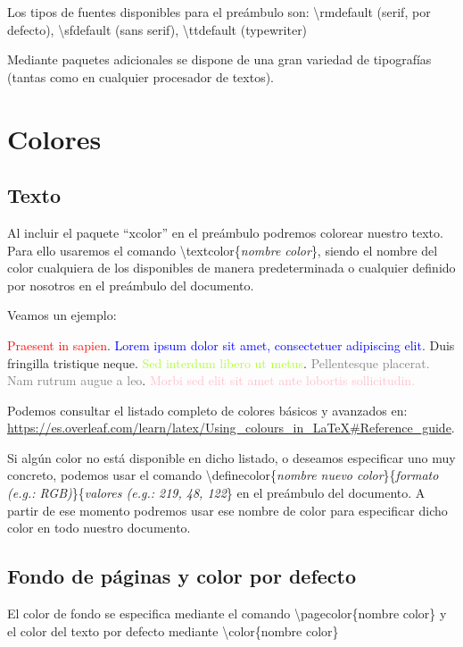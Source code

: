 \documentclass[12pt]{book} %
\begin{document}
Los tipos de fuentes disponibles para el preámbulo son: \textbackslash rmdefault (serif, por defecto), \textbackslash sfdefault (sans serif), \textbackslash ttdefault (typewriter)

Mediante paquetes adicionales se dispone de una gran variedad de tipografías (tantas como en cualquier procesador de textos).

\section{Colores}

\subsection{Texto}

Al incluir el paquete ``xcolor'' en el preámbulo podremos colorear  nuestro texto. Para ello usaremos el comando \textbackslash textcolor\{\emph{nombre color}\}, siendo el nombre del color cualquiera de los disponibles de manera predeterminada o cualquier definido por nosotros en el preámbulo del documento.

Veamos un ejemplo:

\textcolor{red}{Praesent in sapien}.
\textcolor{blue}{Lorem ipsum dolor sit amet, consectetuer 
adipiscing elit}.
\textcolor{TealBlue}{Duis fringilla tristique neque}.
\textcolor{GreenYellow}{Sed interdum libero ut metus}.
\textcolor{gray}{Pellentesque placerat. Nam rutrum augue a leo}. 
\textcolor{pink}{Morbi sed elit sit amet ante lobortis sollicitudin.}

Podemos consultar el listado completo de colores básicos y avanzados en: \url{https://es.overleaf.com/learn/latex/Using_colours_in_LaTeX#Reference_guide}.

Si algún color no está disponible en dicho listado, o deseamos especificar uno muy concreto, podemos usar el comando \textbackslash definecolor\{\emph{nombre nuevo color}\}\{\emph{formato (e.g.: RGB)}\}\{\emph{valores (e.g.: 219, 48, 122}\} en el preámbulo del documento. A partir de ese momento podremos usar ese nombre de color para especificar dicho color en todo nuestro documento.

\subsection{Fondo de páginas y color por defecto}

El color de fondo se especifica mediante el comando \textbackslash pagecolor\{nombre color\} y el color del texto por defecto mediante  \textbackslash color\{nombre color\}
\end{document}
